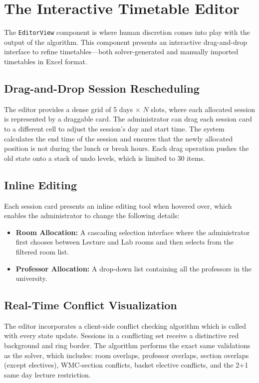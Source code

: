 \section{The Interactive Timetable Editor}
\label{sec:editor}

The \texttt{EditorView} component is where human discretion comes into play with the output of the algorithm. This component presents an interactive drag-and-drop interface to refine timetables---both solver-generated and manually imported timetables in Excel format.

\subsection{Drag-and-Drop Session Rescheduling}

The editor provides a dense grid of 5 days $\times$ $N$ slots, where each allocated session is represented by a draggable card. The administrator can drag each session card to a different cell to adjust the session’s day and start time. The system calculates the end time of the session and ensures that the newly allocated position is not during the lunch or break hours. Each drag operation pushes the old state onto a stack of undo levels, which is limited to 30 items.

\subsection{Inline Editing}

Each session card presents an inline editing tool when hovered over, which enables the administrator to change the following details:
\begin{itemize}
    \item \textbf{Room Allocation:} A cascading selection interface where the administrator first chooses between Lecture and Lab rooms and then selects from the filtered room list.
    \item \textbf{Professor Allocation:} A drop-down list containing all the professors in the university.
\end{itemize}


\subsection{Real-Time Conflict Visualization}

The editor incorporates a client-side conflict checking algorithm which is called with every state update. Sessions in a conflicting set receive a distinctive red background and ring border. The algorithm performs the exact same validations as the solver, which includes: room overlaps, professor overlaps, section overlaps (except electives), WMC-section conflicts, basket elective conflicts, and the 2+1 same day lecture restriction.

